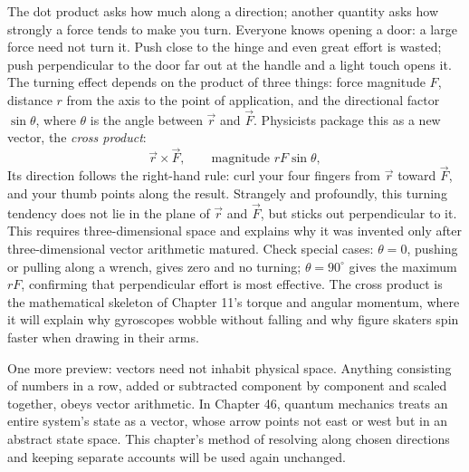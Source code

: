 \begin{challenge}
The dot product asks how much along a direction; another quantity asks how strongly a force tends to make you turn. Everyone knows opening a door: a large force need not turn it. Push close to the hinge and even great effort is wasted; push perpendicular to the door far out at the handle and a light touch opens it. The turning effect depends on the product of three things: force magnitude \(F\), distance \(r\) from the axis to the point of application, and the directional factor \(\sin\theta\), where \(\theta\) is the angle between \(\vec r\) and \(\vec F\). Physicists package this as a new vector, the \emph{cross product}:
\[
  \vec{r}\times\vec{F},\qquad \text{magnitude } rF\sin\theta ,
\]
Its direction follows the right-hand rule: curl your four fingers from \(\vec r\) toward \(\vec F\), and your thumb points along the result. Strangely and profoundly, this turning tendency does not lie in the plane of \(\vec r\) and \(\vec F\), but sticks out perpendicular to it. This requires three-dimensional space and explains why it was invented only after three-dimensional vector arithmetic matured. Check special cases: \(\theta=0\), pushing or pulling along a wrench, gives zero and no turning; \(\theta=90^{\circ}\) gives the maximum \(rF\), confirming that perpendicular effort is most effective. The cross product is the mathematical skeleton of Chapter 11's torque and angular momentum, where it will explain why gyroscopes wobble without falling and why figure skaters spin faster when drawing in their arms.

One more preview: vectors need not inhabit physical space. Anything consisting of numbers in a row, added or subtracted component by component and scaled together, obeys vector arithmetic. In Chapter 46, quantum mechanics treats an entire system's state as a vector, whose arrow points not east or west but in an abstract state space. This chapter's method of resolving along chosen directions and keeping separate accounts will be used again unchanged.
\end{challenge}


